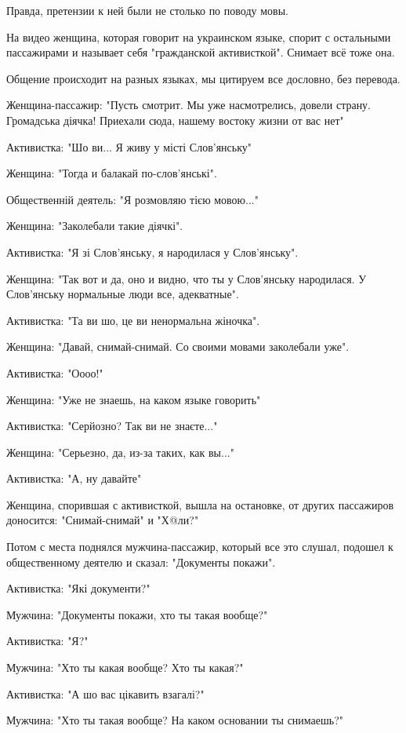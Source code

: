 Правда, претензии к ней были не столько по поводу мовы. 

На видео женщина, которая говорит на украинском языке, спорит с остальными
пассажирами и называет себя "гражданской активисткой". Снимает всё тоже она. 

Общение происходит на разных языках, мы цитируем все дословно, без перевода. 

Женщина-пассажир: "Пусть смотрит. Мы уже насмотрелись, довели страну.
Громадська діячка! Приехали сюда, нашему востоку жизни от вас нет"

Активистка: "Шо ви... Я живу у місті Слов’янську"

Женщина: "Тогда и балакай по-слов’янські". 

Общественній деятель: "Я розмовляю тією мовою..."

Женщина: "Заколебали такие діячкі". 

Активистка: "Я зі Слов’янську, я народилася у Слов’янську". 

Женщина: "Так вот и да, оно и видно, что ты у Слов’янську народилася. У
Слов’янську нормальные люди все, адекватные". 

Активистка: "Та ви шо, це ви ненормальна жіночка". 

Женщина: "Давай, снимай-снимай. Со своими мовами заколебали уже". 

Активистка: "Оооо!"

Женщина: "Уже не знаешь, на каком языке говорить"

Активистка: "Серйозно? Так ви не знаєте..."

Женщина: "Серьезно, да, из-за таких, как вы..."

Активистка: "А, ну давайте"

Женщина, спорившая с активисткой, вышла на остановке, от других пассажиров
доносится: "Снимай-снимай" и "Х@ли?"  

Потом с места поднялся мужчина-пассажир, который все это слушал, подошел к
общественному деятелю и сказал: "Документы покажи". 

Активистка: "Які документи?"

Мужчина: "Документы покажи, хто ты такая вообще?"

Активистка: "Я?"

Мужчина: "Хто ты какая вообще? Хто ты какая?"

Активистка: "А шо вас цікавить взагалі?"

Мужчина: "Хто ты такая вообще? На каком основании ты снимаешь?"

